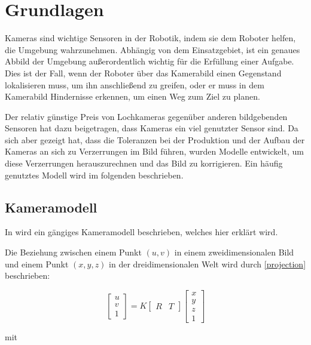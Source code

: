 \chapter{Grundlagen}
\label{chap:grundlagen}

Kameras sind wichtige Sensoren in der Robotik, indem sie dem Roboter helfen, die Umgebung wahrzunehmen. Abhängig von dem Einsatzgebiet, ist ein genaues Abbild der Umgebung außerordentlich wichtig für die Erfüllung einer Aufgabe. Dies ist der Fall, wenn der Roboter über das Kamerabild einen Gegenstand lokalisieren muss, um ihn anschließend zu greifen, oder er muss in dem Kamerabild Hindernisse erkennen, um einen Weg zum Ziel zu planen.

Der relativ günstige Preis von Lochkameras gegenüber anderen bildgebenden Sensoren hat dazu beigetragen, dass Kameras ein viel genutzter Sensor sind. Da sich aber gezeigt hat, dass die Toleranzen bei der Produktion und der Aufbau der Kameras an sich zu Verzerrungen im Bild führen, wurden Modelle entwickelt, um diese Verzerrungen herauszurechnen und das Bild zu korrigieren. Ein häufig genutztes Modell wird im folgenden beschrieben.

\section{Kameramodell} %
\label{sec:kameramodell}
In \cite{Zhang} wird ein gängiges Kameramodell beschrieben, welches hier erklärt wird.

Die Beziehung zwischen einem Punkt $(u, v)$ in einem zweidimensionalen Bild und einem Punkt $(x, y, z)$ in der dreidimensionalen Welt wird durch \autoref{projection} beschrieben:

\begin{equation}
\begin{bmatrix}
 	u \\
 	v \\
 	1
\end{bmatrix} = K 
\begin{bmatrix}
   	R & T
\end{bmatrix} 
\begin{bmatrix}
   	x \\
   	y \\
   	z \\
   	1
\end{bmatrix} \label{projection}
\end{equation}

mit 

